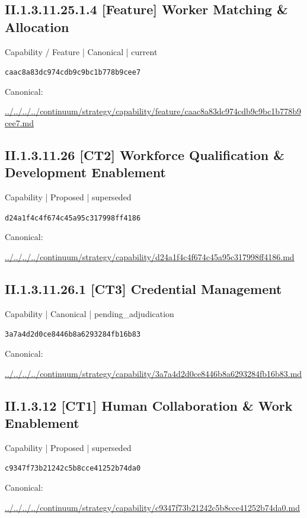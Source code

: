 \documentclass[10pt,a4paper]{article}
\begin{document}
\subsection*{II.1.3.11.25.1.4 [Feature] Worker Matching \& Allocation}
{\small Capability / Feature | Canonical | current}\par
\texttt{caac8a83dc974cdb9c9bc1b778b9cee7}\par
Canonical: \par
{\footnotesize\url{../../../../continuum/strategy/capability/feature/caac8a83dc974cdb9c9bc1b778b9cee7.md}}\par
\subsection*{II.1.3.11.26 [CT2] Workforce Qualification \& Development Enablement}
{\small Capability | Proposed | superseded}\par
\texttt{d24a1f4c4f674c45a95c317998ff4186}\par
Canonical: \par
{\footnotesize\url{../../../../continuum/strategy/capability/d24a1f4c4f674c45a95c317998ff4186.md}}\par
\subsection*{II.1.3.11.26.1 [CT3] Credential Management}
{\small Capability | Canonical | pending\_adjudication}\par
\texttt{3a7a4d2d0ce8446b8a6293284fb16b83}\par
Canonical: \par
{\footnotesize\url{../../../../continuum/strategy/capability/3a7a4d2d0ce8446b8a6293284fb16b83.md}}\par
\subsection*{II.1.3.12 [CT1] Human Collaboration \& Work Enablement}
{\small Capability | Proposed | superseded}\par
\texttt{c9347f73b21242c5b8cce41252b74da0}\par
Canonical: \par
{\footnotesize\url{../../../../continuum/strategy/capability/c9347f73b21242c5b8cce41252b74da0.md}}\par
\end{document}
